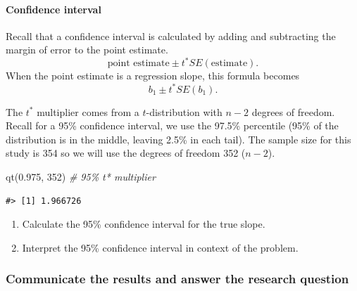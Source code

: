 \documentclass[
]{report}
\newenvironment{Shaded}{\begin{snugshade}}{\end{snugshade}}
\newcommand{\CommentTok}[1]{\textcolor[rgb]{0.56,0.35,0.01}{\textit{#1}}}
\newcommand{\DecValTok}[1]{\textcolor[rgb]{0.00,0.00,0.81}{#1}}
\newcommand{\FloatTok}[1]{\textcolor[rgb]{0.00,0.00,0.81}{#1}}
\newcommand{\FunctionTok}[1]{\textcolor[rgb]{0.00,0.00,0.00}{#1}}
\newcommand{\NormalTok}[1]{#1}
\begin{document}
\vspace{0.5in}

\hypertarget{confidence-interval-8}{%
\paragraph*{Confidence interval}\label{confidence-interval-8}}

Recall that a confidence interval is calculated by adding and subtracting the margin of error to the point estimate.\\
\[\mbox{point estimate}\pm t^*SE(\mbox{estimate}).\]
When the point estimate is a regression slope, this formula becomes
\[b_1 \pm t^* SE(b_1).\]

The \(t^*\) multiplier comes from a \(t\)-distribution with \(n-2\) degrees of freedom. Recall for a 95\% confidence interval, we use the 97.5\% percentile (95\% of the distribution is in the middle, leaving 2.5\% in each tail). The sample size for this study is 354 so we will use the degrees of freedom 352 (\(n-2\)).

\begin{Shaded}
\begin{Highlighting}[]
\FunctionTok{qt}\NormalTok{(}\FloatTok{0.975}\NormalTok{, }\DecValTok{352}\NormalTok{) }\CommentTok{\# 95\% t* multiplier }
\end{Highlighting}
\end{Shaded}

\begin{verbatim}
#> [1] 1.966726
\end{verbatim}

\begin{enumerate}
\def\labelenumi{\arabic{enumi}.}
\setcounter{enumi}{11}
\item
  Calculate the 95\% confidence interval for the true slope.
  \vspace{0.8in}
\item
  Interpret the 95\% confidence interval in context of the problem.
\end{enumerate}

\vspace{.8in}

\hypertarget{communicate-the-results-and-answer-the-research-question-5}{%
\subsubsection*{Communicate the results and answer the research question}\label{communicate-the-results-and-answer-the-research-question-5}}
\end{document}
